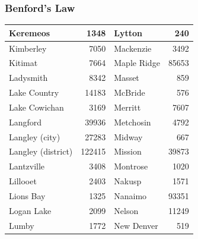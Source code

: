 \documentclass[xcolor=dvipsnames]{beamer}
\begin{document}
\begin{frame}
  \frametitle{Benford's Law}
\begin{tabular}{|l|r|l|r|}
\hline
Keremeos           & 1348   & Lytton      & 240   \\
\hline
Kimberley          & 7050   & Mackenzie   & 3492  \\
\hline
Kitimat            & 7664   & Maple Ridge & 85653 \\
\hline
Ladysmith          & 8342   & Masset      & 859   \\
\hline
Lake Country       & 14183  & McBride     & 576   \\
\hline
Lake Cowichan      & 3169   & Merritt     & 7607  \\
\hline
Langford           & 39936  & Metchosin   & 4792  \\
\hline
Langley (city)     & 27283  & Midway      & 667   \\
\hline
Langley (district) & 122415 & Mission     & 39873 \\
\hline
Lantzville         & 3408   & Montrose    & 1020  \\
\hline
Lillooet           & 2403   & Nakusp      & 1571  \\
\hline
Lions Bay          & 1325   & Nanaimo     & 93351 \\
\hline
Logan Lake         & 2099   & Nelson      & 11249 \\
\hline
Lumby              & 1772   & New Denver  & 519   \\
\hline
\end{tabular}

\end{frame}
\end{document}
